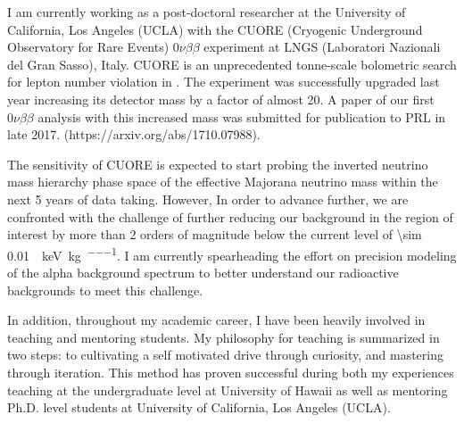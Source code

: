 \documentclass[10pt,a4paper,sans]{moderncv}        %
\begin{document}
I am currently working as a post-doctoral researcher at the University of
California, Los Angeles (UCLA) with the CUORE (Cryogenic Underground
Observatory for Rare Events) $0\nu\beta\beta$ experiment at LNGS (Laboratori
Nazionali del Gran Sasso), Italy. CUORE is an unprecedented tonne-scale
bolometric search for lepton number violation in . The experiment
was successfully upgraded last year increasing its detector mass by a factor of
almost 20. A paper of our first $0\nu\beta\beta$ analysis with this increased
mass was submitted for publication to PRL in late 2017.
(https://arxiv.org/abs/1710.07988).

The sensitivity of CUORE is expected to start probing the inverted neutrino
mass hierarchy phase space of the effective Majorana neutrino mass within the
next 5 years of data taking. However, In order to advance further, we are
confronted with the challenge of further reducing our background in the region
of interest by more than \num{2} orders of magnitude below the current level of
\SI{\sim 0.01}{\per\kilo\electronvolt\per\kilo\gram\per\year}. I am
currently spearheading the effort on precision modeling of the alpha background
spectrum to better understand our radioactive backgrounds to meet this
challenge.

In addition, throughout my academic career, I have been heavily involved in
teaching and mentoring students. My philosophy for teaching is summarized in
two steps: to cultivating a self motivated drive through curiosity, and
mastering through iteration. This method has proven successful during both my
experiences teaching at the undergraduate level at University of Hawaii as well
as mentoring Ph.D. level students at University of California, Los Angeles
(UCLA).

\end{document}
